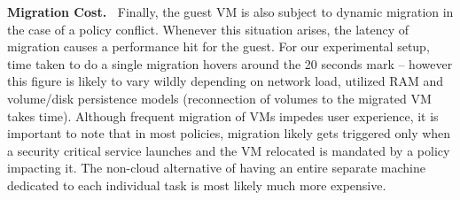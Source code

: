\noindent
{\bf Migration Cost.~}
% 
Finally, the guest VM is also subject to dynamic migration in the case of a
policy conflict.  Whenever this situation arises, the latency of migration
causes a performance hit for the guest.  For our experimental setup, time
taken to do a single migration hovers around the 20 seconds mark -- however
this figure is likely to vary wildly depending on network load, utilized RAM
and volume/disk persistence models (reconnection of volumes to the migrated
VM takes time).  Although frequent migration of VMs impedes user experience, it is important to note that in most
policies, migration likely gets triggered only when a security critical
service launches and the VM relocated is mandated by a policy impacting it. The
non-cloud alternative of having an entire separate machine dedicated to each
individual task is most likely much more expensive.

